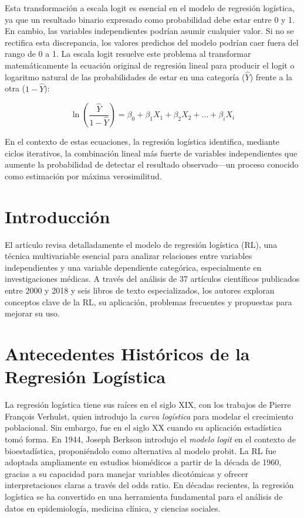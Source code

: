 \documentclass[12pt]{article}
\begin{document}
Esta transformaci\'on a escala logit es esencial en el modelo de regresi\'on log\'istica, ya que un resultado binario expresado como probabilidad debe estar entre 0 y 1. En cambio, las variables independientes podr\'ian asumir cualquier valor. Si no se rectifica esta discrepancia, los valores predichos del modelo podr\'ian caer fuera del rango de 0 a 1. La escala logit resuelve este problema al transformar matem\'aticamente la ecuaci\'on original de regresi\'on lineal para producir el logit o logaritmo natural de las probabilidades de estar en una categor\'ia (\( \hat{Y} \)) frente a la otra (\( 1 - \hat{Y} \)):

\begin{equation}
\ln\left(\frac{\hat{Y}}{1 - \hat{Y}}\right) = \beta_0 + \beta_1 X_1 + \beta_2 X_2 + \ldots + \beta_i X_i
\end{equation}

En el contexto de estas ecuaciones, la regresi\'on log\'istica identifica, mediante ciclos iterativos, la combinaci\'on lineal m\'as fuerte de variables independientes que aumente la probabilidad de detectar el resultado observado—un proceso conocido como estimaci\'on por m\'axima verosimilitud.


\section*{Introducci\'on}
El art\'iculo revisa detalladamente el modelo de regresi\'on log\'istica (RL), una t\'ecnica multivariable esencial para analizar relaciones entre variables independientes y una variable dependiente categ\'orica, especialmente en investigaciones m\'edicas. A trav\'es del an\'alisis de 37 art\'iculos cient\'ificos publicados entre 2000 y 2018 y seis libros de texto especializados, los autores exploran conceptos clave de la RL, su aplicaci\'on, problemas frecuentes y propuestas para mejorar su uso.

\section*{Antecedentes Hist\'oricos de la Regresi\'on Log\'istica}
La regresi\'on log\'istica tiene sus ra\'ices en el siglo XIX, con los trabajos de Pierre François Verhulst, quien introdujo la \textit{curva log\'istica} para modelar el crecimiento poblacional. Sin embargo, fue en el siglo XX cuando su aplicaci\'on estad\'istica tom\'o forma. En 1944, Joseph Berkson introdujo el \textit{modelo logit} en el contexto de bioestad\'istica, proponi\'endolo como alternativa al modelo probit. La RL fue adoptada ampliamente en estudios biom\'edicos a partir de la d\'ecada de 1960, gracias a su capacidad para manejar variables dicot\'omicas y ofrecer interpretaciones claras a trav\'es del odds ratio. En d\'ecadas recientes, la regresi\'on log\'istica se ha convertido en una herramienta fundamental para el an\'alisis de datos en epidemiolog\'ia, medicina cl\'inica, y ciencias sociales.
\end{document}
